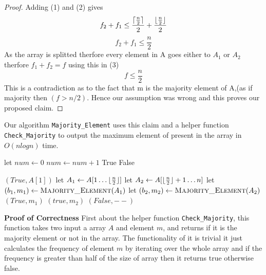 \documentclass[answers]{exam}
\begin{document}
\begin{questions}
\begin{parts}
\begin{solution}
\begin{proof}
Adding (1) and (2) gives
\[
f_{2} +f_{1} \leq \frac{\lceil\frac{n}{2}\rceil}{2} + \frac{\lfloor\frac{n}{2}\rfloor}{2}
\]
\begin{equation}
f_{2} +f_{1} \leq \frac{n}{2}
\end{equation}
As the array is splitted therfore every element in A goes either to $A_{1}$ or $A_{2}$ therfore $f_{1} + f_{2}=f$ using this in (3) 
\[
f \leq \frac{n}{2}
\]
This is a contradiction as to the fact that m is the majority element of A,(as if majority then $(f>n/2)$.
Hence our assumption was wrong and this proves our proposed claim.
\end{proof}

Our algorithm \texttt{Majority\_Element} uses this claim and a helper function \texttt{Check\_Majority} to output the maximum element of present in the array in $O(nlogn)$ time.

\begin{algorithmic}[1]
\State let $num \gets 0$
\State $num \gets num+1$
\EndIf
\EndFor
{}
\State \Return True
\Else 
\State \Return False
\EndIf
\EndFunction
\end{algorithmic}

\begin{algorithmic}[1]
\State \Return $(True,A[1])$
\EndIf
\State let $A_{1} \gets A[1 \ldots \lfloor\frac{n}{2}\rfloor ]$
\State let $A_{2} \gets A[\lfloor\frac{n}{2}\rfloor+1 \ldots n ]$
\State let $(b_{1},m_{1}) \gets \Call{Majority\_Element}{A_{1}}$
\State let $(b_{2},m_{2}) \gets \Call{Majority\_Element}{A_{2}}$
\State \Return $(True,m_{1})$
\EndIf
\EndIf
{}
\State \Return $(true,m_{2})$
\EndIf
\EndIf
\State \Return $(False, --)$
\EndFunction
\end{algorithmic}

\textbf{Proof of Correctness}
\newline First about the helper function \texttt{Check\_Majority}, this function takes two input a array $A$ and element $m$, and returns if it is the majority element or not in the array. The functionality of it is trivial it just calculates the frequency of element $m$ by iterating over the whole array and if the frequency is greater than half of the size of array then it returns true otherwise false.



\end{solution}
\end{parts}
\end{questions}
\end{document}
